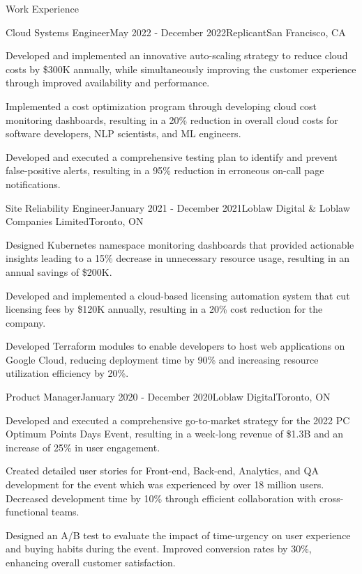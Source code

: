 \documentclass{resume} %
\begin{document}

\begin{rSection}{Work Experience}

\begin{rSubsection}{Cloud Systems Engineer}{May 2022 - December 2022}{Replicant}{San Francisco, CA}
\item Developed and implemented an innovative auto-scaling strategy to reduce cloud costs by \$300K annually, while simultaneously improving the customer experience through improved availability and performance.
\item Implemented a cost optimization program through developing cloud cost monitoring dashboards, resulting in a 20\% reduction in overall cloud costs for software developers, NLP scientists, and ML engineers.
\item Developed and executed a comprehensive testing plan to identify and prevent false-positive alerts, resulting in a 95\% reduction in erroneous on-call page notifications.
\end{rSubsection}

\begin{rSubsection}{Site Reliability Engineer}{January 2021 - December 2021}{Loblaw Digital \& Loblaw Companies Limited}{Toronto, ON}
\item Designed Kubernetes namespace monitoring dashboards that provided actionable insights leading to a 15\% decrease in unnecessary resource usage, resulting in an annual savings of \$200K.
\item Developed and implemented a cloud-based licensing automation system that cut licensing fees by \$120K annually, resulting in a 20\% cost reduction for the company.
\item Developed Terraform modules to enable developers to host web applications on Google Cloud, reducing deployment time by 90\% and increasing resource utilization efficiency by 20\%.
\end{rSubsection}

\begin{rSubsection}{Product Manager}{January 2020 - December 2020}{Loblaw Digital}{Toronto, ON}
\item Developed and executed a comprehensive go-to-market strategy for the 2022 PC Optimum Points Days Event, resulting in a week-long revenue of \$1.3B and an increase of 25\% in user engagement.
\item Created detailed user stories for Front-end, Back-end, Analytics, and QA development for the event which was experienced by over 18 million users. Decreased development time by 10\% through efficient collaboration with cross-functional teams.
\item Designed an A/B test to evaluate the impact of time-urgency on user experience and buying habits during the event. Improved conversion rates by 30\%, enhancing overall customer satisfaction.
\end{rSubsection}


\end{rSection}
\end{document}
